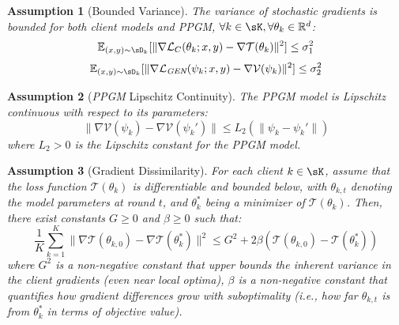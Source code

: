 \documentclass[lettersize,journal]{IEEEtran}
\newtheorem{assumption}{Assumption}
\begin{document}
\begin{assumption}[Bounded Variance]
\label{asm:3}
The variance of stochastic gradients is bounded for both client models and \emph{PPGM}, $\forall k \in \sK, \forall \theta_k \in \mathbb{R}^d$:
\begin{equation}
    \mathbb{E}_{(x,y)\sim\sD_k}[\|\nabla\mathcal{L}_C(\theta_k; x, y) - \nabla \mathcal{T}(\theta_k)\|^2] \leq \sigma_1^2
\end{equation}
\begin{equation}
    \mathbb{E}_{(x,y)\sim \sD_k}[\|\nabla\mathcal{L}_{\emph{GEN}}(\psi_k; x, y) - \nabla \mathcal{V}(\psi_k)\|^2] \leq \sigma_2^2
\end{equation}
\end{assumption}

\begin{assumption}[\emph{PPGM} Lipschitz Continuity]
\label{asm:4}
The \emph{PPGM} model is Lipschitz continuous with respect to its parameters:
\begin{equation}
    \|\nabla \mathcal{V}(\psi_k) - \nabla \mathcal{V}(\psi_k') \| \leq L_2(\|\psi_k - \psi_k'\|)
\end{equation}
where $L_2 > 0$ is the Lipschitz constant for the \emph{PPGM} model.
\end{assumption}

\begin{assumption}[Gradient Dissimilarity]
\label{asm:5}
For each client \( k \in \sK \), assume that the loss function \( \mathcal{T}(\theta_k) \) is differentiable and bounded below, with \( \theta_{k,t} \) denoting the model parameters at round \( t \), and \( \theta_k^* \) being a minimizer of \( \mathcal{T}(\theta_k) \). Then, there exist constants \( G \geq 0 \) and \( \beta \geq 0 \) such that:
\begin{equation}
\frac{1}{K}\sum_{k=1}^K \|\nabla \mathcal{T}(\theta_{k,0}) - \nabla \mathcal{T}(\theta_k^*)\|^2 
\leq G^2 + 2\beta \left( \mathcal{T}(\theta_{k,0}) - \mathcal{T}(\theta_k^*) \right)
\end{equation}
where \( G^2 \) is a non-negative constant that upper bounds the inherent variance in the client gradients (even near local optima), \( \beta \) is a non-negative constant that quantifies how gradient differences grow with suboptimality (i.e., how far \( \theta_{k,t} \) is from \( \theta_k^* \) in terms of objective value).

\end{assumption}
\end{document}
